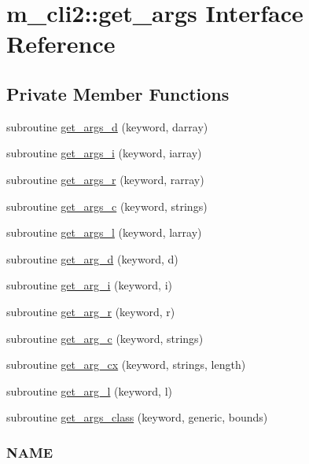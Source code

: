 \hypertarget{interfacem__cli2_1_1get__args}{}\section{m\+\_\+cli2\+:\+:get\+\_\+args Interface Reference}
\label{interfacem__cli2_1_1get__args}
\subsection*{Private Member Functions}
\begin{DoxyCompactItemize}
\item 
subroutine \mbox{\hyperlink{interfacem__cli2_1_1get__args_a4508f384dc3ea5ad71f7e8b5cbdb1f25}{get\+\_\+args\+\_\+d}} (keyword, darray)
\item 
subroutine \mbox{\hyperlink{interfacem__cli2_1_1get__args_ab386dff91f7fbb1573208bf6276158f0}{get\+\_\+args\+\_\+i}} (keyword, iarray)
\item 
subroutine \mbox{\hyperlink{interfacem__cli2_1_1get__args_a335a4e76349b577737c8c5c3dcb8ee5c}{get\+\_\+args\+\_\+r}} (keyword, rarray)
\item 
subroutine \mbox{\hyperlink{interfacem__cli2_1_1get__args_ace85b451389be5cadee3cc8566f004b1}{get\+\_\+args\+\_\+c}} (keyword, strings)
\item 
subroutine \mbox{\hyperlink{interfacem__cli2_1_1get__args_a63a053bae5bf6f21f66065964276ba24}{get\+\_\+args\+\_\+l}} (keyword, larray)
\item 
subroutine \mbox{\hyperlink{interfacem__cli2_1_1get__args_a8462b5b5e803f269bdf55aecdbd55dee}{get\+\_\+arg\+\_\+d}} (keyword, d)
\item 
subroutine \mbox{\hyperlink{interfacem__cli2_1_1get__args_afd2008c19f0ebab2f29024cd0eff43a6}{get\+\_\+arg\+\_\+i}} (keyword, i)
\item 
subroutine \mbox{\hyperlink{interfacem__cli2_1_1get__args_ad3ded65b5d473fd6ab52a733defeddfe}{get\+\_\+arg\+\_\+r}} (keyword, r)
\item 
subroutine \mbox{\hyperlink{interfacem__cli2_1_1get__args_a64eadcbcf0b4b812c95072483499df09}{get\+\_\+arg\+\_\+c}} (keyword, strings)
\item 
subroutine \mbox{\hyperlink{interfacem__cli2_1_1get__args_a06ee25c1638081a2d358b65ee27683c9}{get\+\_\+arg\+\_\+cx}} (keyword, strings, length)
\item 
subroutine \mbox{\hyperlink{interfacem__cli2_1_1get__args_a45ceafeb5d5874473cb78e02f636ed20}{get\+\_\+arg\+\_\+l}} (keyword, l)
\item 
subroutine \mbox{\hyperlink{interfacem__cli2_1_1get__args_a6f2594c5e547d1f41ed69150d07e6b54}{get\+\_\+args\+\_\+class}} (keyword, generic, bounds)
\begin{DoxyCompactList}\small\item\em \subsubsection*{N\+A\+ME}


\end{DoxyCompactList}
\end{DoxyCompactItemize}
